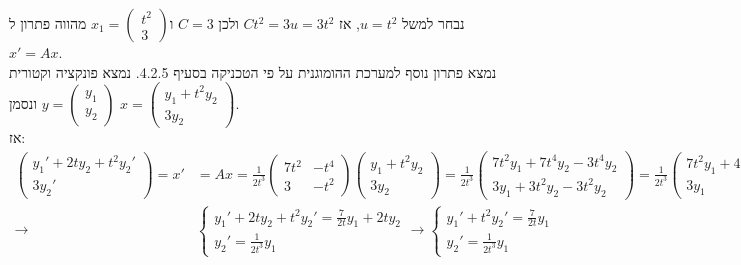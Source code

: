 \documentclass{article}
\begin{document}
נבחר למשל $u=t^2$, אז $Ct^2=3u=3t^2$ ולכן $C=3$ ו$x_1=\begin{pmatrix}
        t^2 \\
        3
    \end{pmatrix}$ מהווה פתרון ל$x'=Ax$. \\
נמצא פתרון נוסף למערכת ההומוגנית על פי הטכניקה בסעיף 4.2.5. נמצא פונקציה וקטורית $y=\begin{pmatrix}
        y_1 \\
        y_2
    \end{pmatrix}$ ונסמן $x=\begin{pmatrix}
        y_1+t^2y_2 \\
        3y_2
    \end{pmatrix}$. \\
אז:
\begin{align*}
    \begin{pmatrix}
        y_1'+2ty_2+t^2y_2' \\
        3y_2'
    \end{pmatrix}=x' & =Ax=\frac{1}{2t^3}\begin{pmatrix}
                                             7t^2 & -t^4 \\
                                             3    & -t^2
                                         \end{pmatrix}\begin{pmatrix}
                                                          y_1+t^2y_2 \\
                                                          3y_2
                                                      \end{pmatrix}=
    \frac{1}{2t^3}\begin{pmatrix}
                      7t^2y_1+7t^4y_2-3t^4y_2 \\
                      3y_1 + 3t^2y_2-3t^2y_2
                  \end{pmatrix}=\frac{1}{2t^3}\begin{pmatrix}
                                                  7t^2y_1+4t^4y_2 \\
                                                  3y_1
                                              \end{pmatrix}                      \\
    \rightarrow           & \begin{cases}
                                y_1'+2ty_2+t^2y_2' = \frac{7}{2t}y_1+2ty_2 \\
                                y_2'=\frac{1}{2t^3}y_1
                            \end{cases} \rightarrow \begin{cases}
                                                        y_1'+t^2y_2' = \frac{7}{2t}y_1 \\
                                                        y_2'=\frac{1}{2t^3}y_1
                                                    \end{cases}
\end{align*}
\end{document}
